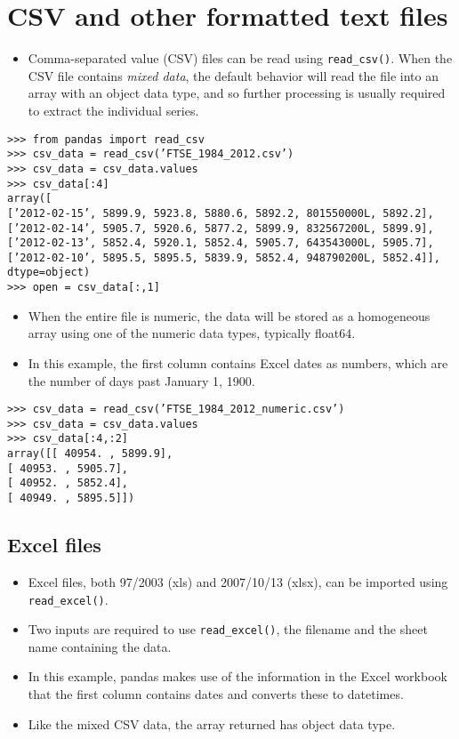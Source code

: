 \documentclass[11pt]{article} %
\begin{document}
\section{CSV and other formatted text files}
\begin{itemize}
	\item Comma-separated value (CSV) files can be read using \texttt{read\_csv()}. When the CSV file contains \textit{mixed data},
	the default behavior will read the file into an array with an object data type, and so further processing is
	usually required to extract the individual series.
\end{itemize}

{
	\large

\begin{verbatim}
>>> from pandas import read_csv
>>> csv_data = read_csv(’FTSE_1984_2012.csv’)
>>> csv_data = csv_data.values
>>> csv_data[:4]
array([
[’2012-02-15’, 5899.9, 5923.8, 5880.6, 5892.2, 801550000L, 5892.2],
[’2012-02-14’, 5905.7, 5920.6, 5877.2, 5899.9, 832567200L, 5899.9],
[’2012-02-13’, 5852.4, 5920.1, 5852.4, 5905.7, 643543000L, 5905.7],
[’2012-02-10’, 5895.5, 5895.5, 5839.9, 5852.4, 948790200L, 5852.4]], 
dtype=object)
>>> open = csv_data[:,1]
\end{verbatim}

}
\begin{itemize}
\item When the entire file is numeric, the data will be stored as a homogeneous array using one of the numeric
data types, typically float64. 
\item In this example, the first column contains Excel dates as numbers, which are
the number of days past January 1, 1900.
\end{itemize}

\begin{framed}
	\begin{verbatim}
>>> csv_data = read_csv(’FTSE_1984_2012_numeric.csv’)
>>> csv_data = csv_data.values
>>> csv_data[:4,:2]
array([[ 40954. , 5899.9],
[ 40953. , 5905.7],
[ 40952. , 5852.4],
[ 40949. , 5895.5]])
\end{verbatim}
\end{framed}
\subsection{Excel files}
\begin{itemize}
	\item Excel files, both 97/2003 (xls) and 2007/10/13 (xlsx), can be imported using \texttt{read\_excel()}. 
	\item Two inputs are
	required to use \texttt{read\_excel()}, the filename and the sheet name containing the data. 
	\item In this example, pandas
	makes use of the information in the Excel workbook that the first column contains dates and converts
	these to datetimes. 
	\item Like the mixed CSV data, the array returned has object data type.
\end{itemize}
\end{document}
